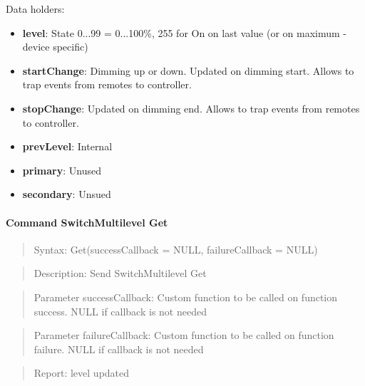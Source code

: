 \noindent
Data holders:

\begin{itemize}
\item \textbf{level}: State 0...99 = 0...100\%, 255 for On on last value (or on maximum - device specific)
\item \textbf{startChange}: Dimming up or down. Updated on dimming start. Allows to trap events from remotes to controller.
\item \textbf{stopChange}: Updated on dimming end. Allows to trap events from remotes to controller.
\item \textbf{prevLevel}: Internal
\item \textbf{primary}: Unused
\item \textbf{secondary}: Unsued
\end{itemize}

\paragraph{Command SwitchMultilevel Get}
\begin{quote}Syntax: Get(successCallback = NULL, failureCallback = NULL)\end{quote}
\begin{quote}Description: Send SwitchMultilevel Get\end{quote}
\begin{quote}Parameter successCallback: Custom function to be called on function success. NULL if callback is not needed\end{quote}
\begin{quote}Parameter failureCallback: Custom function to be called on function failure. NULL if callback is not needed\end{quote}
\begin{quote}Report: level updated\end{quote}

